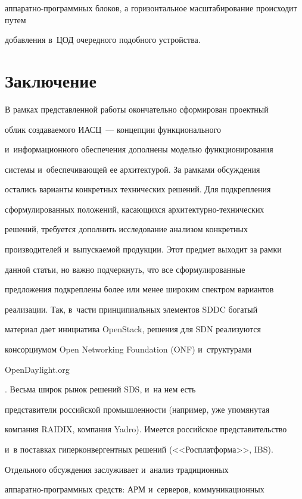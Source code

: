 ап\-па\-рат\-но-программных блоков, а горизонтальное масштабирование происходит путем 


добавления в~ЦОД очередного подобного устройства.





\section{Заключение}





В рамках представленной работы окончательно сформирован проектный 


облик создаваемого ИАСЦ~--- концепции функционального 


и~информационного обеспечения дополнены моделью функционирования 


системы и~обес\-пе\-чи\-ва\-ющей ее архитектурой. За рамками обсуждения 


остались варианты конкретных технических решений. Для подкрепления 


сформулированных положений, ка\-са\-ющих\-ся архитектурно-технических 


решений, требуется дополнить исследование анализом конкретных 


производителей и~выпускаемой продукции. Этот предмет выходит за рамки 


данной статьи, но важно подчеркнуть, что все сформулированные 


предложения подкреплены более или менее широким спектром вариантов 


реализации. Так, в~части принципиальных элементов SDDC богатый 


материал дает инициатива OpenStack, решения для SDN реализуются 


консорциумом Open Networking Foundation (ONF) и~структурами {\sf 


OpenDaylight.org}. Весьма широк рынок решений SDS, и~на нем есть 


представители российской про\-мыш\-лен\-ности (например, уже упомянутая 


компания RAIDIX, компания Yadro). Имеется российское представительство 


и~в поставках гиперконвергентных решений (<<Росплатформа>>, IBS). 


Отдельного обсуждения заслуживает и~анализ традиционных  


ап\-па\-рат\-но-про\-грам\-мных средств: АРМ и~серверов, коммуникационных 


